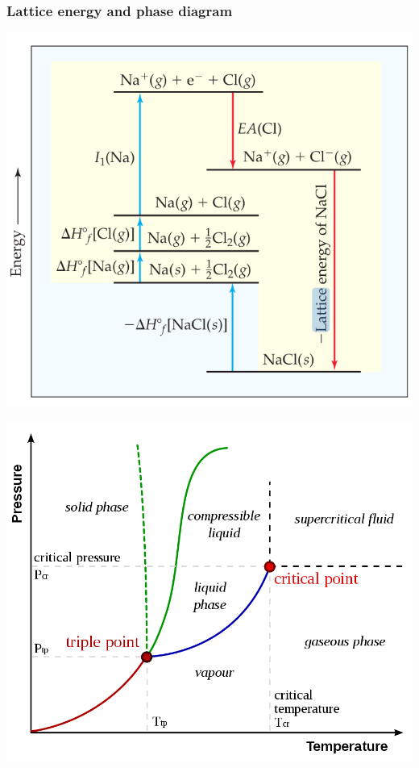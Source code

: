 \documentclass[ wastespaceontitle, english]{cheat_sheet_template}
\begin{document}
     \subsubsection{Lattice energy and phase diagram}
     \begin{minipage}{0.45\linewidth}
         \includegraphics[width=1 \linewidth]{pictures/lattice_energy.png}
     \end{minipage} 
     \begin{minipage}{0.45\linewidth}
         \includegraphics[width=1 \linewidth]{pictures/phasediagram.png}
     \end{minipage}
\end{document}

